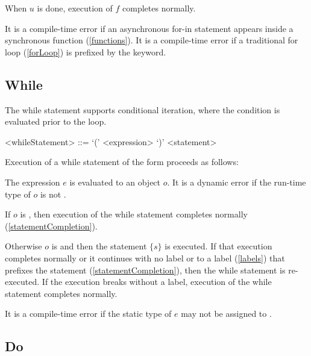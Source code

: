 \documentclass[makeidx]{article}
\begin{document}
{\LMHash{}%
When $u$ is done, execution of $f$ completes normally.

\LMHash{}%
It is a compile-time error if an asynchronous for-in statement appears inside a synchronous function (\ref{functions}).
It is a compile-time error if a traditional for loop (\ref{forLoop}) is prefixed by the \AWAIT{} keyword.



\subsection{While}

\LMHash{}%
The while statement supports conditional iteration, where the condition is evaluated prior to the loop.

\begin{grammar}
<whileStatement> ::= \WHILE{} `(' <expression> `)' <statement>
\end{grammar}

\LMHash{}%
Execution of a while statement of the form  proceeds as follows:

\LMHash{}%
The expression $e$ is evaluated to an object $o$.
It is a dynamic error if the run-time type of $o$ is not .

\LMHash{}%
If $o$ is \FALSE{}, then execution of the while statement completes normally (\ref{statementCompletion}).

\LMHash{}%
Otherwise $o$ is \TRUE{} and then the statement $\{s\}$ is executed.
If that execution completes normally or it continues with no label or to a label (\ref{labels}) that prefixes the \WHILE{} statement (\ref{statementCompletion}), then the while statement is re-executed.
If the execution breaks without a label, execution of the while statement completes normally.

\LMHash{}%
It is a compile-time error if the static type of $e$ may not be assigned to .


\subsection{Do}

}
\end{document}
